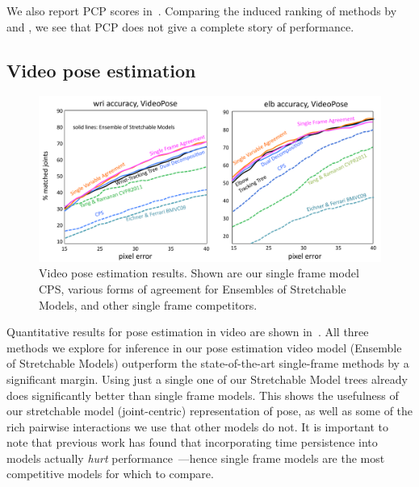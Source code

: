 We also report PCP scores in~.  Comparing the induced ranking 
of methods by  and , we see that 
PCP does not give a complete story of performance.

\subsection{Video pose estimation}
\begin{figure}[tb]
\begin{center}
\includegraphics[width=1.00\textwidth]{figs/results-vpose.pdf}
\caption[Video pose estimation results.]{Video pose estimation results.  Shown 
are our single frame model CPS, various forms of agreement for Ensembles of 
Stretchable Models, and other single frame competitors.}
\label{fig:results-vpose}
\end{center}
\end{figure}

Quantitative results for pose estimation in video are shown 
in~.  All three methods we explore for inference in our 
pose estimation video model (Ensemble of Stretchable Models) outperform the 
state-of-the-art single-frame methods by a significant margin.  Using just a 
single one of our Stretchable Model trees already does significantly better 
than single frame models.  This shows the usefulness of our stretchable model 
(joint-centric) representation of pose, as well as some of the rich pairwise 
interactions we use that other models do not.  It is important to note that 
previous work has found that incorporating time persistence into models 
actually {\em hurt } performance~\citep{posesearch,weisssapp10}---hence single 
frame models are the most competitive models for which to compare.

